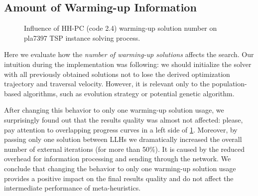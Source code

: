 \subsection{Amount of Warming-up Information}\label{eval:2:llh changes}
\begin{figure}[h]
	\centering
	\vspace{-10pt}
	
	\caption{Influence of HH-PC (code 2.4) warming-up solution number on pla7397 TSP instance solving process.}
	\vspace{-5pt}
	\label{eval:2:pict:warming-up solutions}
\end{figure}
Here we evaluate how the \emph{number of warming-up solutions} affects the search. Our intuition during the implementation was following: we should initialize the solver with all previously obtained solutions not to lose the derived optimization trajectory and traversal velocity. However, it is relevant only to the population-based algorithms, such as evolution strategy or potential genetic algorithm.

After changing this behavior to only one warming-up solution usage, we surprisingly found out that the results quality was almost not affected: please, pay attention to overlapping progress curves in a left side of \cref{eval:2:pict:warming-up solutions}. Moreover, by passing only one solution between LLHs we dramatically increased the overall number of external iterations (for more than 50\%). It is caused by the reduced overhead for information processing and sending through the network. We conclude that changing the behavior to only one warming-up solution usage provides a positive impact on the final results quality and do not affect the intermediate performance of meta-heuristics.



